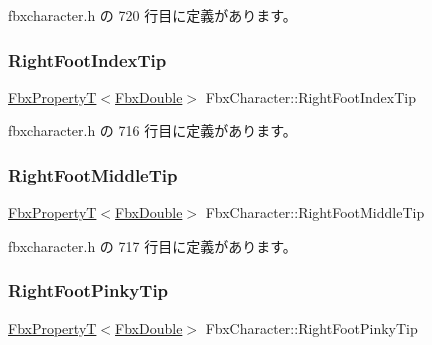  fbxcharacter.\+h の 720 行目に定義があります。

\mbox{\label{class_fbx_character_a174b601c330f92ed0bf0e5e321ec48ad}} 
\subsubsection{\texorpdfstring{Right\+Foot\+Index\+Tip}{RightFootIndexTip}}
{\footnotesize\ttfamily \hyperlink{class_fbx_property_t}{Fbx\+PropertyT}$<$\hyperlink{fbxtypes_8h_a171e72a1c46fc15c1a6c9c31948c1c5b}{Fbx\+Double}$>$ Fbx\+Character\+::\+Right\+Foot\+Index\+Tip}



 fbxcharacter.\+h の 716 行目に定義があります。

\mbox{\label{class_fbx_character_a3804bbcc2d3f2bd87ce7c88cada6618b}} 
\subsubsection{\texorpdfstring{Right\+Foot\+Middle\+Tip}{RightFootMiddleTip}}
{\footnotesize\ttfamily \hyperlink{class_fbx_property_t}{Fbx\+PropertyT}$<$\hyperlink{fbxtypes_8h_a171e72a1c46fc15c1a6c9c31948c1c5b}{Fbx\+Double}$>$ Fbx\+Character\+::\+Right\+Foot\+Middle\+Tip}



 fbxcharacter.\+h の 717 行目に定義があります。

\mbox{\label{class_fbx_character_a180d0cf795cda71d5447d443f28c50bd}} 
\subsubsection{\texorpdfstring{Right\+Foot\+Pinky\+Tip}{RightFootPinkyTip}}
{\footnotesize\ttfamily \hyperlink{class_fbx_property_t}{Fbx\+PropertyT}$<$\hyperlink{fbxtypes_8h_a171e72a1c46fc15c1a6c9c31948c1c5b}{Fbx\+Double}$>$ Fbx\+Character\+::\+Right\+Foot\+Pinky\+Tip}



